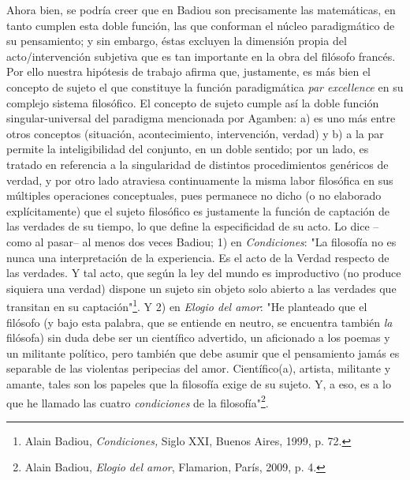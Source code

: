 Ahora bien, se podría creer que en Badiou son precisamente las
matemáticas, en tanto cumplen esta doble función, las que conforman el
núcleo paradigmático de su pensamiento; y sin embargo, éstas excluyen la
dimensión propia del acto/intervención subjetiva que es tan importante
en la obra del filósofo francés. Por ello nuestra hipótesis de trabajo
afirma que, justamente, es más bien el concepto de sujeto el que
constituye la función paradigmática \emph{par excellence} en su complejo
sistema filosófico. El concepto de sujeto cumple así la doble función
singular-universal del paradigma mencionada por Agamben: a) es uno más
entre otros conceptos (situación, acontecimiento, intervención, verdad)
y b) a la par permite la inteligibilidad del conjunto, en un doble
sentido; por un lado, es tratado en referencia a la singularidad de
distintos procedimientos genéricos de verdad, y por otro lado atraviesa
continuamente la misma labor filosófica en sus múltiples operaciones
conceptuales, pues permanece no dicho (o no elaborado explícitamente)
que el sujeto filosófico es justamente la función de captación de las
verdades de su tiempo, lo que define la especificidad de su acto. Lo
dice --como al pasar-- al menos dos veces Badiou; 1) en
\emph{Condiciones}: "La filosofía no es nunca una interpretación de la
experiencia. Es el acto de la Verdad respecto de las verdades. Y tal
acto, que según la ley del mundo es improductivo (no produce siquiera
una verdad) dispone un sujeto sin objeto solo abierto a las verdades que
transitan en su captación"\footnote{Alain Badiou, \emph{Condiciones,}
  Siglo XXI, Buenos Aires, 1999, p. 72.}. Y 2) en \emph{Elogio del
amor}: "He planteado que el filósofo (y bajo esta palabra, que se
entiende en neutro, se encuentra también \emph{la} filósofa) sin duda
debe ser un científico advertido, un aficionado a los poemas y un
militante político, pero también que debe asumir que el pensamiento
jamás es separable de las violentas peripecias del amor. Científico(a),
artista, militante y amante, tales son los papeles que la filosofía
exige de su sujeto. Y, a eso, es a lo que he llamado las cuatro
\emph{condiciones} de la filosofía"\footnote{Alain Badiou, \emph{Elogio
  del amor}, Flamarion, París, 2009, p. 4.}.


